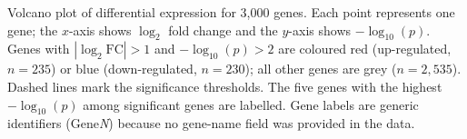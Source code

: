 \caption{Volcano plot of differential expression for 3{,}000 genes.
Each point represents one gene; the $x$-axis shows $\log_2$ fold change and the $y$-axis shows $-\log_{10}(p)$.
Genes with $|\log_2\text{FC}|>1$ and $-\log_{10}(p)>2$ are coloured red (up-regulated, $n=235$) or blue (down-regulated, $n=230$); all other genes are grey ($n=2{,}535$).
Dashed lines mark the significance thresholds.
The five genes with the highest $-\log_{10}(p)$ among significant genes are labelled.
Gene labels are generic identifiers (Gene\textit{N}) because no gene-name field was provided in the data.}
